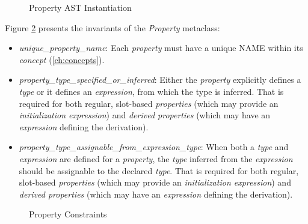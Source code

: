 \begin{figure}
\verbatimfont{\small}

\caption{Property AST Instantiation}
\label{fig:ast:property}
\end{figure}

\begin{constraints}
Figure \ref{fig:ocl:property} presents the invariants
of the \emph{Property} metaclass:

\begin{itemize}

\item \emph{unique\_property\_name}:
Each \emph{property} must have a unique NAME within its \emph{concept}
(\ref{ch:concepts}).

\item \emph{property\_type\_specified\_or\_inferred}:
Either the \emph{property} explicitly defines a \emph{type}
or it defines an \emph{expression},
from which the type is inferred.
That is required for both regular, slot-based \emph{properties}
(which may provide an \emph{initialization expression})
and \emph{derived properties}
(which may have an \emph{expression} defining the derivation).

\item \emph{property\_type\_assignable\_from\_expression\_type}:
When both a \emph{type} and \emph{expression} are defined for a \emph{property},
the \emph{type} inferred from the \emph{expression} should be assignable to
the declared \emph{type}.
That is required for both regular, slot-based \emph{properties}
(which may provide an \emph{initialization expression})
and \emph{derived properties}
(which may have an \emph{expression} defining the derivation).

\end{itemize}
\end{constraints}

\begin{figure}

\caption{Property Constraints}
\label{fig:ocl:property}
\end{figure}
